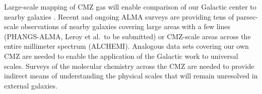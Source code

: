 \documentclass[modern]{aastex62}
\begin{document}
Large-scale mapping of CMZ gas will enable comparison of our Galactic center to
nearby galaxies \citep[e.g.][]{Leroy2018a}.
Recent and ongoing ALMA
surveys are providing tens of parsec-scale observations of nearby galaxies
covering large areas with a few lines (PHANGS-ALMA, Leroy et al.\ to be
submitted) or CMZ-scale areas across the entire millimeter spectrum (ALCHEMI).
Analogous data sets covering our own CMZ are needed to enable the application
of the Galactic work to universal scales.  Surveys of the molecular
chemistry across the CMZ are needed to provide indirect means of understanding
the physical scales that will remain unresolved in external galaxies.





\end{document}
